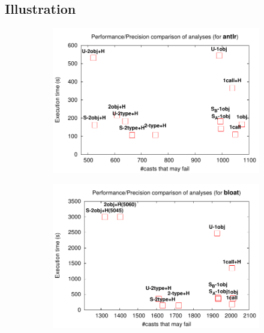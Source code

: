 \subsection{Illustration}

\begin{figure}[tbp]
\vspace{-0.5cm}
\hspace{-1cm}
\begin{center}
\begin{subfigure}[b]{0.45\textwidth}
\includegraphics[width=\textwidth]{assets/hybrid/antlr.pdf}
\end{subfigure}\hspace{1cm}%
\begin{subfigure}[b]{0.45\textwidth}
\includegraphics[width=\textwidth]{assets/hybrid/bloat.pdf}

\end{subfigure}
\end{center}
\end{figure}
